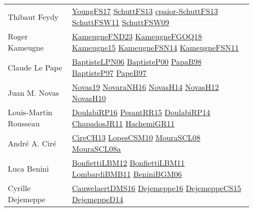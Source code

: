 {\begin{longtable}{p{4cm}p{20cm}}
Thibaut Feydy & \href{papers/YoungFS17.pdf}{YoungFS17}\cite{YoungFS17} \href{papers/SchuttFS13.pdf}{SchuttFS13}\cite{SchuttFS13} \href{papers/cpaior-SchuttFS13.pdf}{cpaior-SchuttFS13}\cite{cpaior-SchuttFS13} \href{articles/SchuttFSW11.pdf}{SchuttFSW11}\cite{SchuttFSW11} \href{papers/SchuttFSW09.pdf}{SchuttFSW09}\cite{SchuttFSW09} \\
Roger Kameugne & \href{papers/KameugneFND23.pdf}{KameugneFND23}\cite{KameugneFND23} \href{papers/KameugneFGOQ18.pdf}{KameugneFGOQ18}\cite{KameugneFGOQ18} \href{articles/Kameugne15.pdf}{Kameugne15}\cite{Kameugne15} \href{articles/KameugneFSN14.pdf}{KameugneFSN14}\cite{KameugneFSN14} \href{papers/KameugneFSN11.pdf}{KameugneFSN11}\cite{KameugneFSN11} \\
Claude Le Pape & \href{}{BaptisteLPN06}\cite{BaptisteLPN06} \href{articles/BaptisteP00.pdf}{BaptisteP00}\cite{BaptisteP00} \href{articles/PapaB98.pdf}{PapaB98}\cite{PapaB98} \href{papers/BaptisteP97.pdf}{BaptisteP97}\cite{BaptisteP97} \href{}{PapeB97}\cite{PapeB97} \\
Juan M. Novas & \href{articles/Novas19.pdf}{Novas19}\cite{Novas19} \href{articles/NovaraNH16.pdf}{NovaraNH16}\cite{NovaraNH16} \href{articles/NovasH14.pdf}{NovasH14}\cite{NovasH14} \href{articles/NovasH12.pdf}{NovasH12}\cite{NovasH12} \href{articles/NovasH10.pdf}{NovasH10}\cite{NovasH10} \\
Louis{-}Martin Rousseau & \href{}{DoulabiRP16}\cite{DoulabiRP16} \href{papers/PesantRR15.pdf}{PesantRR15}\cite{PesantRR15} \href{papers/DoulabiRP14.pdf}{DoulabiRP14}\cite{DoulabiRP14} \href{papers/ChapadosJR11.pdf}{ChapadosJR11}\cite{ChapadosJR11} \href{articles/HachemiGR11.pdf}{HachemiGR11}\cite{HachemiGR11} \\
Andr{\'{e}} A. Cir{\'{e}} & \href{papers/CireCH13.pdf}{CireCH13}\cite{CireCH13} \href{articles/LopesCSM10.pdf}{LopesCSM10}\cite{LopesCSM10} \href{papers/MouraSCL08.pdf}{MouraSCL08}\cite{MouraSCL08} \href{papers/MouraSCL08a.pdf}{MouraSCL08a}\cite{MouraSCL08a} \\
Luca Benini & \href{papers/BonfiettiLBM12.pdf}{BonfiettiLBM12}\cite{BonfiettiLBM12} \href{papers/BonfiettiLBM11.pdf}{BonfiettiLBM11}\cite{BonfiettiLBM11} \href{papers/LombardiBMB11.pdf}{LombardiBMB11}\cite{LombardiBMB11} \href{papers/BeniniBGM06.pdf}{BeniniBGM06}\cite{BeniniBGM06} \\
Cyrille Dejemeppe & \href{papers/CauwelaertDMS16.pdf}{CauwelaertDMS16}\cite{CauwelaertDMS16} \href{}{Dejemeppe16}\cite{Dejemeppe16} \href{papers/DejemeppeCS15.pdf}{DejemeppeCS15}\cite{DejemeppeCS15} \href{papers/DejemeppeD14.pdf}{DejemeppeD14}\cite{DejemeppeD14} \\

\end{longtable}}
